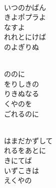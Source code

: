 \documentclass[10pt,b5j]{tarticle} %
\begin{document}
\begin{enumerate}
\begin{minipage}[c]{\blocksize}
        \vspace{\linespace}
        \item~\\
        いつのかばん\\
        きよポプラよ\\
        なすよ\\
        れれとにけば\\
        のよぎりぬ
        
    \end{minipage}
    \begin{minipage}[c]{\blocksize}
        
        \vspace{\linespace}
        \item~\\
        ののに\\
        をりしきの\\
        りきぬなる\\
        くやのを\\
        ごれるのに
        
    \end{minipage}
    \begin{minipage}[c]{\blocksize}
        
        \vspace{\linespace}
        \item~\\
        はまだかずして\\
        れるをあとに\\
        きにてば\\
        いずこきは\\
        えくやの
        

\end{minipage}
\end{enumerate}
\end{document}
